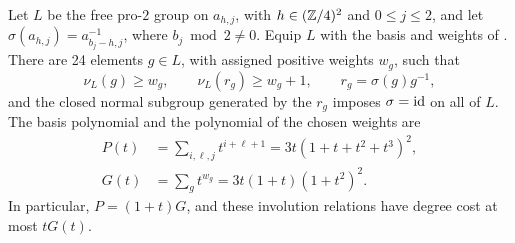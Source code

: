 \begin{proposition}\label{prop:involution}
Let \(L\) be the free pro-\(2\) group on \(a_{h,j}\), with
\(h\in(\mathbb Z/4)^2\) and \(0\le j\le2\), and let
\(\sigma(a_{h,j})=a_{b_j-h,j}^{-1}\), where \(b_j\bmod2\ne0\).
Equip \(L\) with the basis and weights of .
There are 24 elements \(g\in L\), with assigned positive weights
\(w_g\), such that
\[
 \nu_L(g)\ge w_g,\qquad
 \nu_L(r_g)\ge w_g+1,
 \qquad r_g=\sigma(g)g^{-1},
\]
and the closed normal subgroup generated by the \(r_g\) imposes
\(\sigma=\operatorname{id}\) on all of \(L\).  The basis polynomial and the
polynomial of the chosen weights are
\begin{equation}\label{eq:weight-polynomials}
 \begin{split}
 P(t)&=\sum_{i,\ell,j}t^{i+\ell+1}
       =3t(1+t+t^2+t^3)^2,\\
 G(t)&=\sum_g t^{w_g}
       =3t(1+t)(1+t^2)^2.
 \end{split}
\end{equation}
In particular, \(P=(1+t)G\), and these involution relations have
degree cost at most \(tG(t)\).
\end{proposition}

